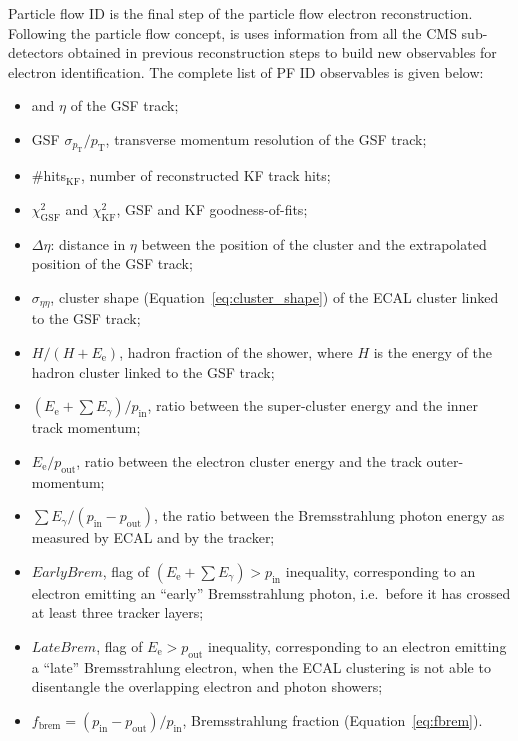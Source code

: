 Particle flow ID is the final step of the particle flow electron reconstruction. Following the particle flow concept,
is uses information from all the CMS sub-detectors obtained in previous reconstruction steps to build new observables
for electron identification. The complete list of PF ID observables is given below:
\begin{itemize}
  \item \pt and $\eta$ of the GSF track;
  \item GSF $\sigma_{p_\text{T}}/p_\text{T}$, transverse momentum resolution of the GSF track;
  \item \#hits$_\text{KF}$, number of reconstructed KF track hits;
  \item $\chi^2_\textrm{GSF}$ and $\chi^2_\textrm{KF}$, GSF and KF goodness-of-fits;
  \item $\Delta\eta$: distance in $\eta$ between the position of the cluster and the extrapolated position of the
  GSF track;
  \item $\sigma_{\eta\eta}$, cluster shape (Equation~\ref{eq:cluster_shape}) of the ECAL cluster linked to the
  GSF track;
  \item $H/(H+E_\text{e})$, hadron fraction of the shower, where $H$ is the energy of the hadron cluster linked to
  the GSF track;
  \item $(E_\text{e}+\sum E_\gamma)/p_\text{in}$, ratio between the super-cluster energy and the inner track
  momentum;
  \item $E_\text{e}/p_\text{out}$, ratio between the electron cluster energy and the track outer-momentum;
  \item $\sum E_\gamma/(p_\text{in}-p_\text{out})$, the ratio between the Bremsstrahlung photon energy as measured by
  ECAL and by the tracker;
  \item $EarlyBrem$, flag of $(E_\text{e}+\sum E_\gamma)>p_\text{in}$ inequality, corresponding to an electron
  emitting an ``early'' Bremsstrahlung photon, i.e.\ before it has crossed at least three tracker layers;
  \item $LateBrem$, flag of $E_\text{e}>p_\text{out}$ inequality, corresponding to an electron emitting a ``late''
  Bremsstrahlung electron, when the ECAL clustering is not able to disentangle the overlapping electron and photon
  showers;
  \item $f_\text{brem} = (p_\text{in}-p_\text{out})/p_\text{in}$, Bremsstrahlung fraction (Equation~\ref{eq:fbrem}).
\end{itemize}

